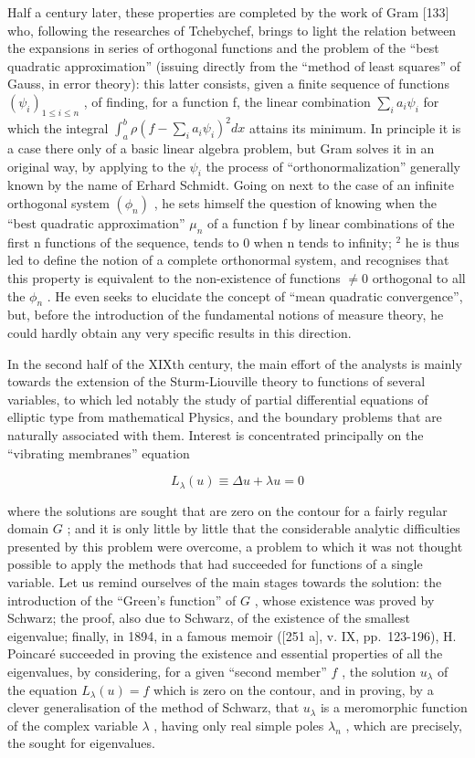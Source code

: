 Half a century later, these properties are completed by the work of Gram {[}133{]} who, following the researches of Tchebychef, brings to light the relation between the expansions in series of orthogonal functions and the problem of the ``best quadratic approximation'' (issuing directly from the ``method of least squares'' of Gauss, in error theory): this latter consists, given a finite sequence of functions \((\psi_{i})_{1\leq i\leq n}\) , of finding, for a function f, the linear combination \(\sum_{i}a_{i}\psi_{i}\) for which the integral \(\int_{a}^{b}\rho(f-\sum_{i}a_{i}\psi_{i})^{2}dx\) attains its minimum. In principle it is a case there only of a basic linear algebra problem, but Gram solves it in an original way, by applying to the \(\psi_{i}\) the process of ``orthonormalization'' generally known by the name of Erhard Schmidt. Going on next to the case of an infinite orthogonal system \((\phi_{n})\) , he sets himself the question of knowing when the ``best quadratic approximation'' \(\mu_{n}\) of a function f by linear combinations of the first n functions of the sequence, tends to 0 when n tends to infinity; \(^{2}\) he is thus led to define the notion of a complete orthonormal system, and recognises that this property is equivalent to the non-existence of functions \(\neq0\) orthogonal to all the \(\phi_{n}\) . He even seeks to elucidate the concept of ``mean quadratic convergence'', but, before the introduction of the fundamental notions of measure theory, he could hardly obtain any very specific results in this direction.

In the second half of the XIXth century, the main effort of the analysts is mainly towards the extension of the Sturm-Liouville theory to functions of several variables, to which led notably the study of partial differential equations of elliptic type from mathematical Physics, and the boundary problems that are naturally associated with them. Interest is concentrated principally on the ``vibrating membranes'' equation

\[
L _ {\lambda} (u) \equiv \Delta u + \lambda u = 0\tag{21.3}
\]

where the solutions are sought that are zero on the contour for a fairly regular domain \(G\) ; and it is only little by little that the considerable analytic difficulties presented by this problem were overcome, a problem to which it was not thought possible to apply the methods that had succeeded for functions of a single variable. Let us remind ourselves of the main stages towards the solution: the introduction of the ``Green's function'' of \(G\) , whose existence was proved by Schwarz; the proof, also due to Schwarz, of the existence of the smallest eigenvalue; finally, in 1894, in a famous memoir ({[}251 a{]}, v. IX, pp.~123-196), H. Poincaré succeeded in proving the existence and essential properties of all the eigenvalues, by considering, for a given ``second member'' \(f\) , the solution \(u_{\lambda}\) of the equation \(L_{\lambda}(u) = f\) which is zero on the contour, and in proving, by a clever generalisation of the method of Schwarz, that \(u_{\lambda}\) is a meromorphic function of the complex variable \(\lambda\) , having only real simple poles \(\lambda_n\) , which are precisely, the sought for eigenvalues.

